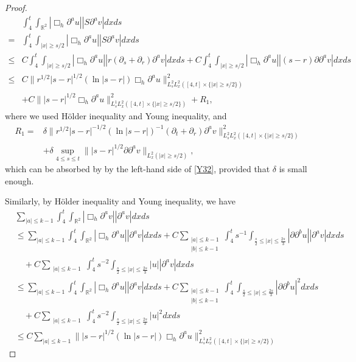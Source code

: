 \documentclass[11pt, reqno]{amsart}
\theoremstyle{definition}
\theoremstyle{remark}
\theoremstyle{definition}
\numberwithin{equation}{section}
\numberwithin{equation}{section}
\def\leq{\leqslant}
\def\geq{\geqslant}
\begin{document}
\begin{proof}
\begin{align}\label{Y34}
&\int_4^t\int_{\mathbb R^2}|\Box_h\partial^au||S\partial^av|dxds
\nonumber\\=&\int_4^t\int_{|x|\geq s/2}|\Box_h\partial^au||S\partial^av|dxds
\nonumber\\\leq& C\int_4^t\int_{|x|\geq s/2}|\Box_h\partial^au||r(\partial_s+\partial_r)\partial^av|dxds+C\int_4^t\int_{|x|\geq 
s/2}|\Box_h\partial^au||(s-r)\partial\partial^av|dxds
\nonumber\\\leq&
C\|r^{1/2}|s-r|^{1/2}(\ln|s-r|)\Box_h\partial^au\|^2_{L^2_sL^2_x([4,t]\times\{|x|\geq
s/2\})}
\nonumber\\&+C\||s-r|^{1/2}\Box_h\partial^au\|^2_{L_s^1L_x^2([4,t]\times\{|x|\geq
s/2\})}+R_1,
\end{align}
where we used H\"{o}lder inequality and Young inequality, and
\begin{align*}
R_1=&\delta \|r^{1/2}|s-r|^{-1/2}(\ln|s-r|)^{-1}(\partial_t+\partial_r)\partial^av\|^2_{L^2_sL^2_x([4,t]\times\{|x|\geq
s/2\})}
\\&+\delta\sup_{4\leq s\leq t}\||s-r|^{1/2}\partial\partial^av\|_{L_x^2(|x|\geq s/2)},
\end{align*}
which can be absorbed by  by the left-hand side of \eqref{Y32}, provided that $\delta$ is small enough.
\par Similarly, by H\"{o}lder inequality and Young inequality, we have
\begin{align}\label{Y42}
&\sum_{|a|\leq k-1}\int_4^t\int_{\mathbb R^2}|\Box_h\partial^av||\partial^av|dxds
\nonumber\\&\leq \sum_{|a|\leq k-1}\int_4^t\int_{\mathbb R^2}|\Box_h\partial^au||\partial^av|dxds+C\sum_{\substack{|a|\leq k-1\\|b|\leq k-1}}\int_4^t
s^{-1}\int_{\frac s2\leq |x|\leq \frac{2s}3}|\partial\partial^bu||\partial^av|dxds
\nonumber\\&\quad+C\sum_{\substack{|a|\leq k-1}}\int_4^t
s^{-2}\int_{\frac s2\leq |x|\leq \frac{2s}3}|u||\partial^av|dxds
\nonumber\\&\leq \sum_{|a|\leq k-1}\int_4^t\int_{\mathbb R^2}|\Box_h\partial^au||\partial^av|dxds+C\sum_{\substack{|a|\leq k-1\\|b|\leq k-1}}\int_4^t
\int_{\frac s2\leq |x|\leq \frac{2s}3}|\partial\partial^bu|^2dxds
\nonumber\\&\quad+C\sum_{\substack{|a|\leq k-1}}\int_4^t
s^{-2}\int_{\frac s2\leq |x|\leq \frac{2s}3}|u|^2dxds
\nonumber\\&\leq C\sum_{|a|\leq k-1}\||s-r|^{1/2}(\ln|s-r|)\Box_h\partial^au\|^2_{L_s^1L_x^2([4,t]\times\{|x|\geq s/2\})}

\end{align}
\end{proof}
\end{document}
